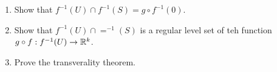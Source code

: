 \documentclass[12pt,a4paper]{report}
\begin{document}
\begin{enumerate}[label=9.\arabic*.]
\begin{enumerate}[label=(\alph*)]

	\item Show that $f^{-1}(U)\cap f^{-1}(S)=g\circ f^{-1}(0)$.
	\item Show that $f^{-1}(U)\cap =^{-1}(S)$ is a regular level set of teh function $g\circ f:f^{-1}(U) \to \mathbb{R}^k$.
	\item Prove the transverality theorem.

\end{enumerate}

\end{enumerate}
\end{document}
